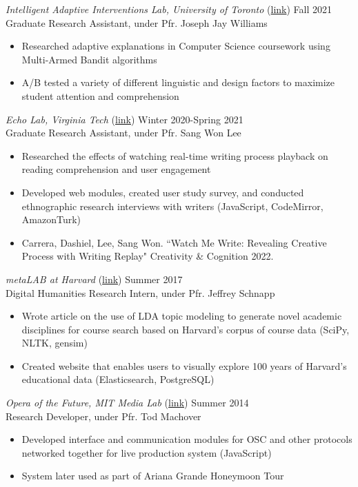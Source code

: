 {\sl Intelligent Adaptive Interventions Lab, University of Toronto} (\href{http://www.josephjaywilliams.com/}{link})\hfill
Fall 2021 \\
Graduate Research Assistant, under Pfr. Joseph Jay Williams \\
\begin{itemize}
\item Researched adaptive explanations in Computer Science coursework using Multi-Armed Bandit algorithms
\item A/B tested a variety of different linguistic and design factors to maximize student attention and comprehension
\end{itemize}

{\sl Echo Lab, Virginia Tech }(\href{http://people.cs.vt.edu/sangwonlee/}{link})\hfill
Winter 2020-Spring 2021 \\
Graduate Research Assistant, under Pfr. Sang Won Lee \\
\begin{itemize} 
\item Researched the effects of watching real-time writing process playback on reading comprehension and user engagement
\item Developed web modules, created user study survey, and conducted ethnographic research interviews with writers (JavaScript, CodeMirror, AmazonTurk)
\item Carrera, Dashiel, Lee, Sang Won. ``Watch Me Write: Revealing Creative Process with Writing Replay" Creativity \& Cognition 2022.\\
\end{itemize} 

{\sl metaLAB at Harvard }(\href{http://metalabharvard.github.io/}{link})\hfill
Summer 2017 \\
Digital Humanities Research Intern, under Pfr. Jeffrey Schnapp  \\
\begin{itemize}
\item Wrote article on the use of LDA topic modeling to generate novel academic disciplines for course search based on Harvard's corpus of course data (SciPy, NLTK, gensim)
\item Created website that enables users to visually explore 100 years of Harvard's educational data (Elasticsearch, PostgreSQL)
\end{itemize}

{\sl Opera of the Future, MIT Media Lab} (\href{https://www.media.mit.edu/groups/opera-of-the-future/overview/}{link})
\hfill Summer 2014 \\
Research Developer, under Pfr. Tod Machover\\
\begin{itemize} \itemsep -2pt %
\item Developed interface and communication modules for OSC and other protocols networked together for live production system (JavaScript)
\item System later used as part of Ariana Grande Honeymoon Tour
\end{itemize}

